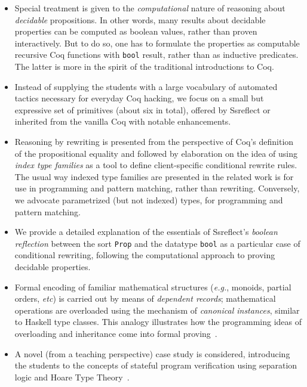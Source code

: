 \documentclass[blockstyle,preprint,nocopyrightspace]{sigplanconf}
\newcommand{\an}[1]{\textcolor{red}{(Aleks: {#1})}}
\newcommand{\code}[1]{\lstinline{#1}}
\newcommand{\etc}{\emph{etc}}
\newcommand{\eg}{\emph{e.g.}\xspace}
\begin{document}
\vspace{5pt}

\begin{itemize}

\item Special treatment is given to the \emph{computational} nature of
  reasoning about \emph{decidable} propositions. In other words, many
  results about decidable properties can be computed as boolean
  values, rather than proven interactively. But to do so, one has to
  formulate the properties as computable recursive Coq functions with
  \code{bool} result, rather than as inductive predicates. The latter
  is more in the spirit of the traditional introductions to Coq.

\item Instead of supplying the students with a large vocabulary of
  automated tactics necessary for everyday Coq hacking, we focus on a
  small but expressive set of primitives (about six in total), offered
  by Ssreflect or inherited from the vanilla Coq with notable
  enhancements.


\item Reasoning by rewriting is presented from the perspective of
  Coq's definition of the propositional equality and followed by
  elaboration on the idea of using \emph{index type families} as a
  tool to define client-specific conditional rewrite rules. The usual
  way indexed type families are presented in the related work is for
  use in programming and pattern matching, rather than rewriting.
  Conversely, we advocate parametrized (but not indexed) types, for
  programming and pattern matching.

\item We provide a detailed explanation of the essentials of
  Ssreflect's \emph{boolean reflection} between the sort \code{Prop}
  and the datatype \code{bool} as a particular case of conditional
  rewriting, following the computational approach to proving decidable
  properties.

\item Formal encoding of familiar mathematical structures (\eg,
  monoids, partial orders, \etc) is carried out by means of
  \emph{dependent records}; mathematical operations are overloaded
  using the mechanism of \emph{canonical instances}, similar to
  Haskell type classes. This analogy illustrates how the programming
  ideas of overloading and inheritance come into formal
  proving~\cite{Garillot-al:TPHOL09}.
%

\item A novel (from a teaching perspective) case study is considered,
  introducing the students to the concepts of stateful program
  verification using separation logic and Hoare Type
  Theory~\cite{Nanevski-al:JFP08}.

\end{itemize}
\end{document}
